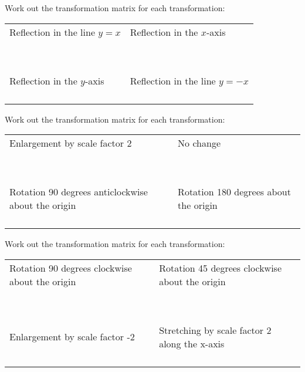 \documentclass[fontsize=20pt]{scrartcl}
\begin{document}
\newpage
Work out the transformation matrix for each transformation:
\newline
\newline
\begin{tabular}{p{13cm}p{13cm}}
Reflection in the line $y=x$
&Reflection in the $x$-axis
\\\\\\\\\\
\\\\\\\\\\

Reflection in the $y$-axis
&Reflection in the line $y=-x$
\\\\\\\\\\
\end{tabular}
\newpage
Work out the transformation matrix for each transformation:
\newline
\newline
\begin{tabular}{p{13cm}p{13cm}}
Enlargement by scale factor 2
&No change
\\\\\\\\\\
\\\\\\\\\\

Rotation 90 degrees anticlockwise about the origin
&Rotation 180 degrees about the origin
\\\\\\\\\\
\end{tabular}
\newpage
Work out the transformation matrix for each transformation:
\newline
\newline
\begin{tabular}{p{13cm}p{13cm}}
Rotation 90 degrees clockwise about the origin
&Rotation 45 degrees clockwise about the origin
\\\\\\\\\\
\\\\\\\\\\

Enlargement by scale factor -2
&Stretching by scale factor 2 along the x-axis
\\\\\\\\\\
\end{tabular}
\end{document}
